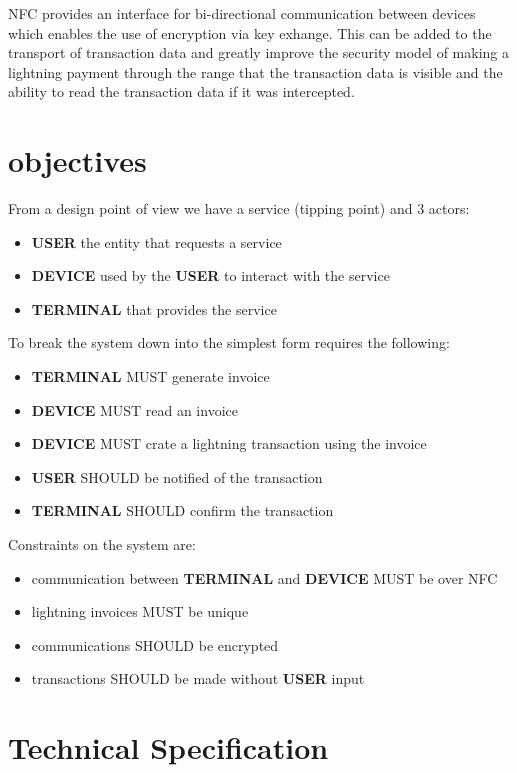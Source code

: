 \documentclass[a4paper]{article}
\begin{document}
NFC provides an interface for bi-directional communication between devices which
enables the use of encryption via key exhange.  This can be added to the
transport of transaction data and greatly improve the security model of making a
lightning payment through the range that the transaction data is visible and the
ability to read the transaction data if it was intercepted.\\

\section{objectives}
From a design point of view we have a service (tipping point) and 3 actors:
\begin{itemize}
    \item \textbf{USER} the entity that requests a service
    \item \textbf{DEVICE} used by the \textbf{USER} to interact with the service
    \item \textbf{TERMINAL} that provides the service
\end{itemize}

To break the system down into the simplest form requires the following:
\begin{itemize}
	\item \textbf{TERMINAL} MUST generate invoice
	\item \textbf{DEVICE} MUST read an invoice
	\item \textbf{DEVICE} MUST crate a lightning transaction using the invoice
	\item \textbf{USER} SHOULD be notified of the transaction
	\item \textbf{TERMINAL} SHOULD confirm the transaction
\end{itemize}

Constraints on the system are:
\begin{itemize}
    \item communication between \textbf{TERMINAL} and \textbf{DEVICE} MUST be over NFC
    \item lightning invoices MUST be unique
	\item communications SHOULD be encrypted
	\item transactions SHOULD be made without \textbf{USER} input
\end{itemize}

\section{Technical Specification}
\end{document}
